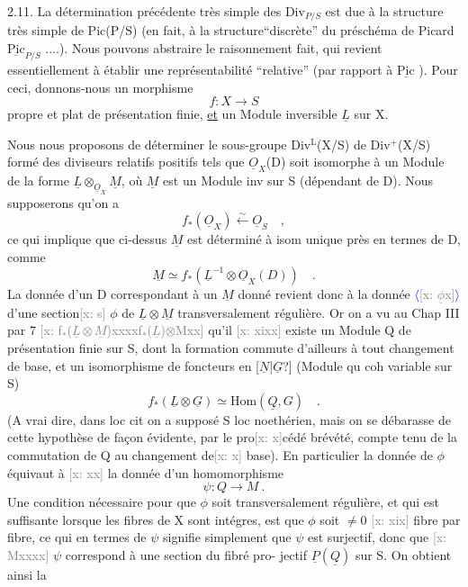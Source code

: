 \documentclass[11pt]{article}
\newcommand{\scanpage}[1]{\par\bigskip\noindent{\small\sffamily[scan #1]}\par}
\newcommand{\mspage}[1]{{\small\sffamily[p.\,#1]}}
\newcommand{\inserted}[2][]{\textcolor{blue}{$\langle$#2$\rangle$}}
\newcommand{\xout}[1]{\textcolor{gray}{[\textsf{x:} #1]}}
\newcommand{\uline}[1]{\underline{#1}}
\newcommand{\unsure}[1]{[#1?]}
\begin{document}
2.11. La détermination précédente très simple des $\mathrm{Div}_{P/S}$ est due à la
structure très simple de Pic(P/S) (en fait, à la structure``discrète'' du
préschéma de Picard $\underline{\mathrm{Pic}}_{P/S}$ ....). Nous pouvons abstraire le raisonnement
fait, qui revient essentiellement à établir une représentabilité ``relative''
(par rapport à $\underline{\mathrm{Pic}}$ ). Pour ceci, donnons-nous un morphisme
\[ f\colon X \to S \]
propre et plat de présentation finie, \uline{et} un Module inversible $\underline{L}$ sur X.

\mspage{109}

\clearpage
\scanpage{25/110}
\mspage{13}

Nous nous proposons de déterminer le sous-groupe Div$^{\mathrm{L}}$(X/S) de Div$^{+}$(X/S)
formé des diviseurs relatifs positifs tels que $\underline{O}_X$(D) soit isomorphe à
un Module de la forme $\underline{L}\otimes_{\underline{O}_X}\underline{M}$, où $\underline{M}$ est un Module inv sur S (dépendant de
D). Nous supposerons qu'on a
\[ f_{*}(\underline{O}_X)\overset{\sim}{\longleftarrow}\underline{O}_S \quad , \]
ce qui implique que ci-dessus $\underline{M}$ est déterminé à isom unique près en termes
de D, comme
\[ \underline{M}\simeq f_{*}(\underline{L}^{-1}\otimes\underline{O}_X(D)) \quad . \]
La donnée d'un D correspondant à un $\underline{M}$ donné revient donc à la donnée
\inserted[typed]{\xout{$\underline{\phi}$x}}
d'une section\xout{s} $\phi$ de $\underline{L}\otimes\underline{M}$ transversalement régulière. Or on a vu au
Chap III par 7 \xout{f$_*$($\underline{L}\otimes\underline{M}$)xxxxf$_*$($\underline{L}$)$\otimes$Mxx} qu'il \xout{xixx} existe un Module Q de
présentation finie sur S, dont la formation commute d'ailleurs à tout
changement de base, et un isomorphisme de foncteurs en \unsure{$\underline{N}$|$\underline{G}$} (Module qu coh
variable sur S)
\[ f_{*}(\underline{L}\otimes\underline{G})\simeq \mathrm{Hom}(\underline{Q},G) \quad . \]
(A vrai dire, dans loc cit on a supposé S loc noethérien, mais on se
débarasse de cette hypothèse de façon évidente, par le pro\xout{x}cédé brévété,
compte tenu de la commutation de Q au changement de\xout{x} base). En particulier
la donnée de $\phi$ équivaut à \xout{xx} la donnée d'un homomorphisme
\[ \psi : Q \longrightarrow M \ . \]
Une condition nécessaire pour que $\phi$ soit transversalement régulière, et
qui est suffisante lorsque les fibres de X sont intégres, est que $\phi$ soit
$\neq 0$ \xout{xix} fibre par fibre, ce qui en termes de $\psi$ signifie simplement que
$\psi$ est surjectif, donc que \xout{Mxxxx} $\psi$ correspond à une section du fibré pro-%
jectif $\underline{P}(\underline{Q})$ sur S. On obtient ainsi la
\end{document}
